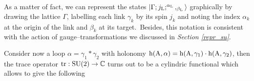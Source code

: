 


\begin{remark}
    As a matter of fact, we can represent the states $\left| \Gamma;j_{\text{\normalfont L}};^{\alpha_{\text{\normalfont L}}},_{\beta_{\text{\normalfont L}}} \right >$ graphically by drawing the lattice $\Gamma$, labelling each link $\gamma_k$ by its spin $j_k$ and noting the index $\alpha_k$ at the origin of the link and $\beta_k$ at its target.\, Besides, this notation is consistent with the action of gauge--transformations we discussed in \emph{Section \ref{repr_su}}. %
\end{remark}




Consider now a loop $\alpha=\gamma_1*\gamma_2$ with holonomy $\text{\normalfont h}(\text{\normalfont A},\alpha)=\text{\normalfont h}(\text{\normalfont A},\gamma_1)\cdot\text{\normalfont h}(\text{\normalfont A},\gamma_2)$, then the trace operator $\text{\normalfont tr}:\text{\normalfont SU}(2)\to\mathbb{C}$ turns out to be a cylindric functional which allows to give the following

